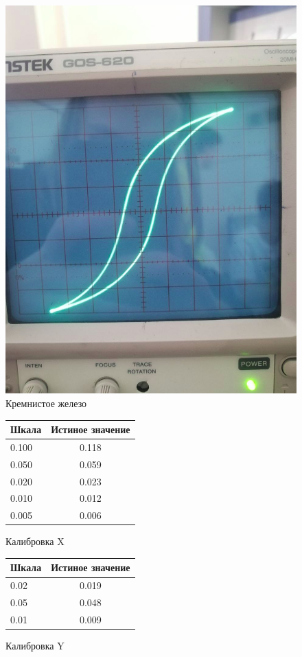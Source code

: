 \documentclass[14pt,a4paper]{article}
\begin{document}
\begin{figure}[H]
  \includegraphics*[width=\textwidth]{2023-09-30-18-32-30.png}
  \caption{Кремнистое железо}
\end{figure}

\begin{figure}[H]
  \centering
  \begin{tabular}{l|c}
    Шкала &Истиное значение \\
    \midrule
    0.100 &  0.118\\
    0.050 &  0.059\\
    0.020 &  0.023\\
    0.010 &  0.012\\
    0.005 &  0.006\caption{Калибровка X}
    \label{x}
  \end{tabular}
\end{figure}
\begin{figure}[H]
\begin{tabular}{l|c}
  Шкала &Истиное значение\\
  \midrule
  0.02 &  0.019 \\
  0.05 &  0.048 \\
  0.01 &  0.009\caption{Калибровка Y}\label{y}
  \end{tabular}
\end{figure}
\end{document}
